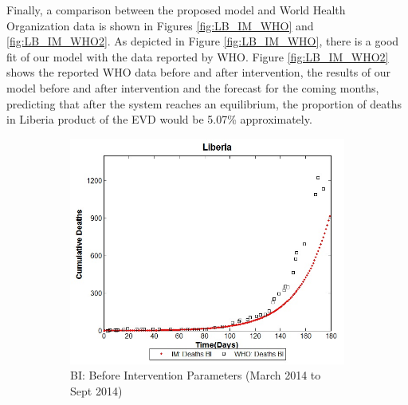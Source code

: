 
\noindent Finally, a comparison between the proposed model and World Health Organization data is shown in Figures \ref{fig:LB_IM_WHO} and \ref{fig:LB_IM_WHO2}. As depicted in Figure \ref{fig:LB_IM_WHO}, there is a good fit of our model with the data reported by WHO. Figure \ref{fig:LB_IM_WHO2} shows  the reported WHO data before and after intervention, the results of our model before and after intervention and the forecast for the coming months, predicting that after the system reaches an equilibrium, the proportion of deaths in Liberia product of the EVD would be 5.07\% approximately.



\begin{figure}[h!]
 \centering 
 \begin{subfigure}[b]{0.38\textwidth}
  \includegraphics[width=\textwidth]{LB_BI_SD_WHO_IM} \caption{BI: Before Intervention Parameters (March 2014  to Sept 2014)} \label{fig:LB_BI_SD_WHO_IM} \end{subfigure}
 \hspace{.1cm}
\begin{subfigure}[b]{0.38\textwidth}

\end{subfigure}
\end{figure}
